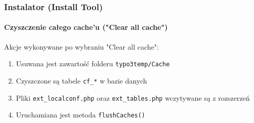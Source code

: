 
\begin{frame}[fragile]
	\frametitle{Instalator (Install Tool)}
	\framesubtitle{Czyszczenie całego cache'u ("Clear all cache")}

	Akcje wykonywane po wybraniu "Clear all cache":

	\begin{enumerate}
		\item Usuwana jest zawartość folderu \texttt{typo3temp/Cache}
		\item Czyszczone są tabele \texttt{cf\_*} w bazie danych
		\item Pliki \texttt{ext\_localconf.php} oraz \texttt{ext\_tables.php}\newline
			wczytywane są z rozszerzeń
		\item Uruchamiana jest metoda \texttt{flushCaches()} 
	\end{enumerate}

\end{frame}


